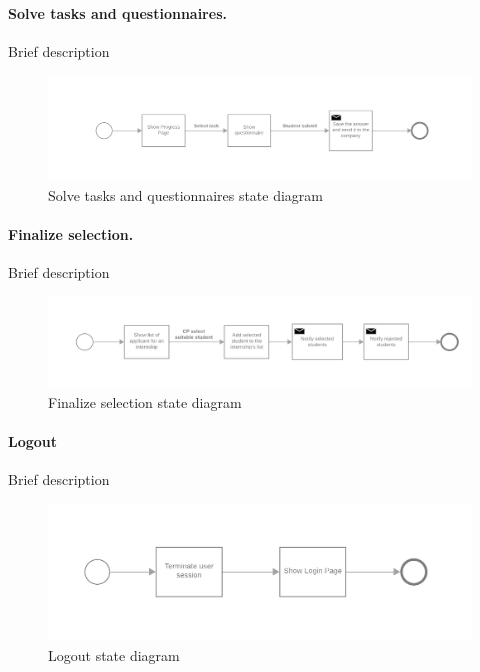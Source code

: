 \paragraph{Solve tasks and questionnaires.}
Brief description

\begin{figure}[H]
    \begin{center}
        \includegraphics[width=1\linewidth]{RASD/LaTeX/Images/StateDiagrams/solve_tasks_and_questionnaires.png}
        \caption{Solve tasks and questionnaires state diagram}
        \label{fig:signup_sd}%
    \end{center}
\end{figure}

\paragraph{Finalize selection.}
Brief description

\begin{figure}[H]
    \begin{center}
        \includegraphics[width=1\linewidth]{RASD/LaTeX/Images/StateDiagrams/finalize_selections.png}
        \caption{Finalize selection state diagram}
        \label{fig:signup_sd}%
    \end{center}
\end{figure}

\paragraph{Logout}
Brief description

\begin{figure}[H]
    \begin{center}
        \includegraphics[width=1\linewidth]{RASD/LaTeX/Images/StateDiagrams/logout.png}
        \caption{Logout state diagram}
        \label{fig:signup_sd}%
    \end{center}
\end{figure}

